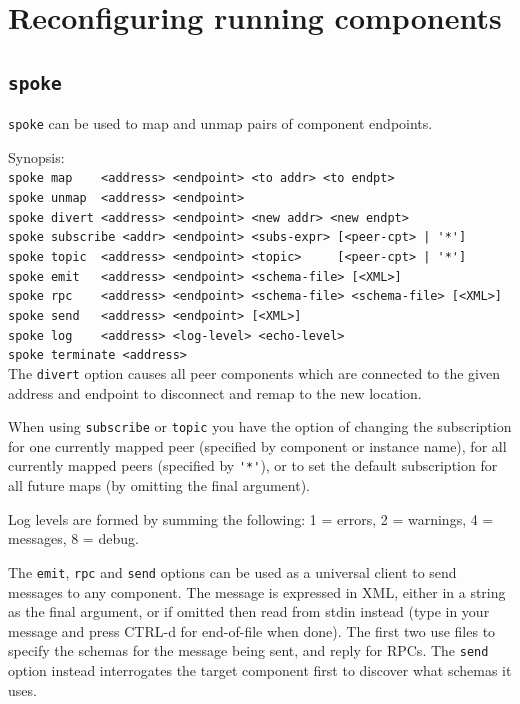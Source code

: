 \documentclass[12pt,a4paper,twoside]{article}
\renewcommand{\_}{\texttt{\symbol{95}}}
\begin{document}
\section{Reconfiguring running components}

\subsection{\texttt{spoke}}

\verb^spoke^ can be used to map and unmap pairs of component endpoints.

Synopsis:\\
\verb^spoke map    <address> <endpoint> <to addr> <to endpt>^\\
\verb^spoke unmap  <address> <endpoint>^\\
\verb^spoke divert <address> <endpoint> <new addr> <new endpt>^\\
\verb^spoke subscribe <addr> <endpoint> <subs-expr> [<peer-cpt> | '*']^\\
\verb^spoke topic  <address> <endpoint> <topic>     [<peer-cpt> | '*']^\\
\verb^spoke emit   <address> <endpoint> <schema-file> [<XML>]^\\
\verb^spoke rpc    <address> <endpoint> <schema-file> <schema-file> [<XML>]^\\
\verb^spoke send   <address> <endpoint> [<XML>]^\\
\verb^spoke log    <address> <log-level> <echo-level>^\\
\verb^spoke terminate <address>^\\

The \verb^divert^ option causes all peer components which are
connected to the given address and endpoint to disconnect and
remap to the new location.

When using \verb^subscribe^ or \verb^topic^
you have the option of changing the subscription for one
currently mapped peer (specified by component or instance name),
for all currently mapped peers (specified by \verb^'*'^), or to
set the default subscription for all future maps (by omitting
the final argument).

Log levels are formed by summing the following: 1 = errors,
2 = warnings, 4 = messages, 8 = debug.

The \verb^emit^, \verb^rpc^ and \verb^send^ options can be used as
a universal client to send messages to any component. The message
is expressed in XML, either in a string as the final argument, or
if omitted then read from stdin instead (type in your message and
press CTRL-d for end-of-file when done). The first two use files
to specify the schemas for the message being sent, and reply
for RPCs. The \verb^send^ option instead interrogates the target
component first to discover what schemas it uses.
\end{document}
